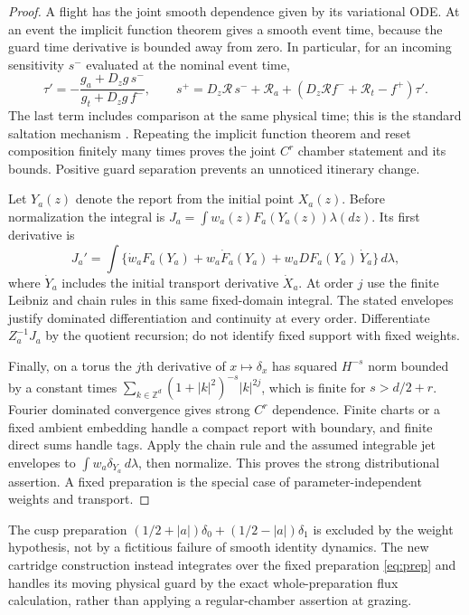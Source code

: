 \begin{proof}
A flight has the joint smooth dependence given by its variational ODE.
At an event the implicit function theorem gives a smooth event time,
because the guard time derivative is bounded away from zero. In particular,
for an incoming sensitivity $s^-$ evaluated at the nominal event time,
\[
 \tau'=-\frac{g_a+D_zg\,s^-}{g_t+D_zg\,f^-},\qquad
 s^+=D_z\mathcal R\,s^-+\mathcal R_a
       +(D_z\mathcal R f^-+\mathcal R_t-f^+)\tau'.
\]
The last term includes comparison at the same physical time; this is the
standard saltation mechanism \cite{KongEtAl}. Repeating the implicit
function theorem and reset composition finitely many times proves the
joint $C^r$ chamber statement and its bounds. Positive guard separation
prevents an unnoticed itinerary change.

Let $Y_a(z)$ denote the report from the initial point $X_a(z)$. Before
normalization the integral is $J_a=\int w_a(z)F_a(Y_a(z))\lambda(dz)$.
Its first derivative is
\[
 J_a'=\int\{\dot w_aF_a(Y_a)
       +w_a\dot F_a(Y_a)+w_a DF_a(Y_a)\,\dot Y_a\}\,d\lambda,
\]
where $\dot Y_a$ includes the initial transport derivative $\dot X_a$.
At order $j$ use the finite Leibniz and chain rules in this same fixed-domain
integral. The stated envelopes justify dominated differentiation and
continuity at every order. Differentiate $Z_a^{-1}J_a$ by the quotient
recursion; do not identify fixed support with fixed weights.

Finally, on a torus the $j$th derivative of $x\mapsto\delta_x$ has squared
$H^{-s}$ norm bounded by a constant times
$\sum_{k\in\mathbb Z^d}(1+|k|^2)^{-s}|k|^{2j}$, which is finite for
$s>d/2+r$. Fourier dominated convergence gives strong $C^r$ dependence.
Finite charts or a fixed ambient embedding handle a compact report with
boundary, and finite direct sums handle tags. Apply the chain rule and the
assumed integrable jet envelopes to
$\int w_a\delta_{Y_a}\,d\lambda$, then normalize. This proves the
strong distributional assertion. A fixed preparation is the special case
of parameter-independent weights and transport.
\end{proof}

The cusp preparation
$(1/2+|a|)\delta_0+(1/2-|a|)\delta_1$ is excluded by the weight hypothesis,
not by a fictitious failure of smooth identity dynamics. The new cartridge
construction instead integrates over the fixed preparation \eqref{eq:prep}
and handles its moving physical guard by the exact whole-preparation flux
calculation, rather than applying a regular-chamber assertion at grazing.
